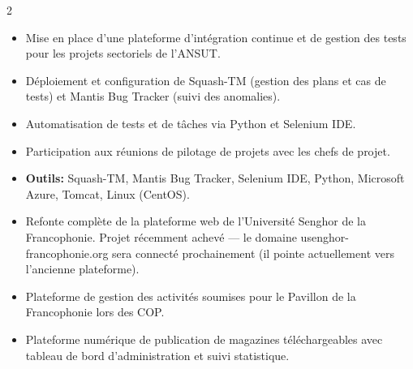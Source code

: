 \documentclass[10pt,a4paper,ragged2e,withhyper]{altacv}
\begin{document}
\begin{paracol}{2}
        \divider
        
        \begin{itemize}
            \item Mise en place d'une plateforme d'intégration continue et de gestion des tests pour les projets sectoriels de l'ANSUT.
            \item Déploiement et configuration de Squash-TM (gestion des plans et cas de tests) et Mantis Bug Tracker (suivi des anomalies).
            \item Automatisation de tests et de tâches via Python et Selenium IDE.
            \item Participation aux réunions de pilotage de projets avec les chefs de projet.
            \item \textcolor{SecondaryColor}{\textbf{Outils: }} Squash-TM, Mantis Bug Tracker, Selenium IDE, Python, Microsoft Azure, Tomcat, Linux (CentOS).
        \end{itemize}



            \begin{itemize}
                \item Refonte complète de la plateforme web de l'Université Senghor de la Francophonie. Projet récemment achevé — le domaine usenghor-francophonie.org sera connecté prochainement (il pointe actuellement vers l'ancienne plateforme).
            \end{itemize}
            \divider

            \begin{itemize}
                \item Plateforme de gestion des activités soumises pour le Pavillon de la Francophonie lors des COP.
            \end{itemize}
            \divider

            \begin{itemize}
                \item Plateforme numérique de publication de magazines téléchargeables avec tableau de bord d'administration et suivi statistique.
            \end{itemize}
            \divider


\end{paracol}
\end{document}
